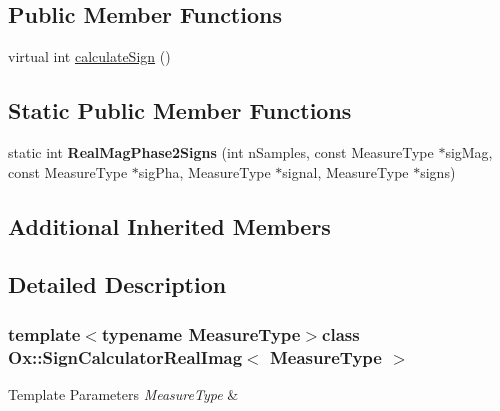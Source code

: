 \subsection*{Public Member Functions}
\begin{DoxyCompactItemize}
\item 
virtual int \hyperlink{class_ox_1_1_sign_calculator_real_imag_ae3f3c8f8e8ea994da7ad56f4a180cb36}{calculate\-Sign} ()
\end{DoxyCompactItemize}
\subsection*{Static Public Member Functions}
\begin{DoxyCompactItemize}
\item 
\hypertarget{class_ox_1_1_sign_calculator_real_imag_a916a7be502489b814bd3b147075ae31d}{static int {\bfseries Real\-Mag\-Phase2\-Signs} (int n\-Samples, const Measure\-Type $\ast$sig\-Mag, const Measure\-Type $\ast$sig\-Pha, Measure\-Type $\ast$signal, Measure\-Type $\ast$signs)}\label{class_ox_1_1_sign_calculator_real_imag_a916a7be502489b814bd3b147075ae31d}

\end{DoxyCompactItemize}
\subsection*{Additional Inherited Members}


\subsection{Detailed Description}
\subsubsection*{template$<$typename Measure\-Type$>$class Ox\-::\-Sign\-Calculator\-Real\-Imag$<$ Measure\-Type $>$}


\begin{DoxyTemplParams}{Template Parameters}
{\em Measure\-Type} & \\
\hline
\end{DoxyTemplParams}


